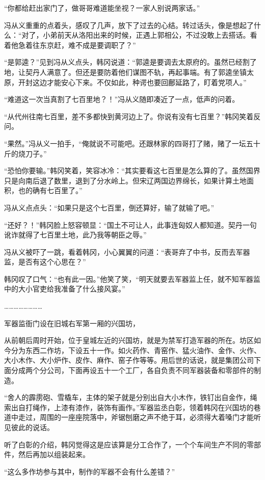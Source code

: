 “你都给赶出家门了，做哥哥难道能坐视？一家人别说两家话。”

冯从义重重的点着头，感叹了几声，放下了过去的心结。转过话头，像是想起了什么：“对了，小弟前天从洛阳出来的时候，正遇上郭相公，不过没敢上去搭话。看着他急着往东京赶，难不成是要调职了？”

“是郭逵？”见到冯从义点头，韩冈说道：“郭逵是要调去太原府的。虽然已经割了地，让契丹人满意了。但还是要防着他们谋图不轨，再起事端。有了郭逵坐镇太原，开封这边才能安心下来。不仅如此，种谔也要回鄜延路了，盯着党项人。”

“难道这一次当真割了七百里地？！”冯从义随即凑近了一点，低声的问着。

“从代州往南七百里，差不多都快到黄河边上了。你说有没有七百里？”韩冈笑着反问。

“果然。”冯从义一拍手，“俺就说不可能吧。还跟林家的四哥打了赌，赌了一坛五十斤的烧刀子。”

“恐怕你要输。”韩冈笑着，笑容冰冷：“其实要看这七百里是怎么算的了。虽然国界只是向南后退了数里，退到了分水岭上。但宋辽两国边界绵长，如果计算土地面积，也的确有七百里了。”

冯从义点点头：“如果只是这个七百里，倒还算好，输了就输了吧。”

“还好？！”韩冈脸上怒容顿显：“国土不可让人，此事连匈奴人都知道。契丹一句讹诈就得了七百里土地，此乃我等朝臣之辱。”

冯从义被吓了一跳，看着韩冈，小心翼翼的问道：“表哥弃了中书，反而去军器监，是否有这个心思在？”

韩冈叹了口气：“也有此一因。”他笑了笑，“明天就要去军器监上任，就不知军器监中的大小官吏给我准备了什么接风宴。”

……………………

军器监衙门设在旧城右军第一厢的兴国坊，

从前朝后周时开始，位于皇城左近的兴国坊，就是为禁军打造军器的所在。坊区如今分为东西二作坊，下设五十一作。如火药作、青窑作、猛火油作、金作、火作、大小木作、大小炉作、皮作、麻作、窑子作等等。用后世的话说，就是集团公司下面分成两个分公司，下面再设五十一个工厂，各自负责不同军器装备和零部件的制造。

“舍人的霹雳砲、雪橇车，主体的架子就是分别出自大小木作，铁钉出自金作，绳索出自打绳作，上漆有漆作，装饰有画作。”军器监丞白彰，领着韩冈在兴国坊的巷道中走过，周围的一座座院落中，斧锯刨磨之声不绝于耳，必须得大着嗓门才能听见彼此的说话。

听了白彰的介绍，韩冈觉得这是应该算是分工合作了，一个个车间生产不同的零部件，然后再加以组装起来。

“这么多作坊参与其中，制作的军器不会有什么差错？”

